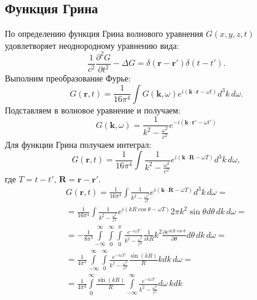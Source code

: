 \documentclass[a4paper,14pt]{extreport} %
\newcommand{\dff}[2]{\frac{\partial #1}{\partial #2}}
\newcommand{\dfs}[2]{\frac{\partial^2 #1}{\partial #2^2}}
\renewcommand{\vec}[1]{\boldsymbol{#1}}
\begin{document}
	\subsection{Функция Грина}
	
	По определению функция Грина волнового уравнения $G(x, y, z, t)$ удовлетворяет неоднородному уравнению вида:
	\begin{equation*}
		\frac{1}{c^2}\dfs{G}{t} - \Delta G = \delta(\vec{r} - \vec{r}') \delta(t - t').
	\end{equation*}
	Выполним преобразование Фурье:
	\begin{equation*}
		G(\vec{r}, t) = \frac{1}{16\pi^4} \int G(\vec{k}, \omega) e^{i\left(\vec{k}\cdot\vec{r} - \omega t\right)} d^3k\, d\omega.
	\end{equation*}
	Подставляем в волновое уравнение и получаем:
	\begin{equation*}
		G(\vec{k}, \omega) = \frac{1}{k^2 - \frac{\omega^2}{c^2}} e^{-i\left(\vec{k}\cdot\vec{r}' - \omega t'\right)}
	\end{equation*}
	Для функции Грина получаем интеграл:
	\begin{equation*}
		G(\vec{r}, t) = \frac{1}{16\pi^4} \int \frac{1}{k^2 - \frac{\omega^2}{c^2}} e^{i\left(\vec{k}\cdot\vec{R} - \omega T\right)} d^3k\, d\omega,
	\end{equation*}
	где $T = t - t'$, $\vec{R} = \vec{r} - \vec{r}'$.
	\begin{equation*}
		\begin{gathered}
			G(\vec{r}, t) = \frac{1}{16\pi^4} \int \frac{1}{k^2 - \frac{\omega^2}{c^2}} e^{i\left(\vec{k}\cdot\vec{R} - \omega T\right)} d^3k\, d\omega = \\ =
			\frac{1}{16\pi^4} \int \frac{1}{k^2 - \frac{\omega^2}{c^2}} e^{i\left(k R \cos \theta - \omega T\right)} 2 \pi k^2 \sin \theta d \theta\,dk \, d\omega = 
			\\ =
			-\frac{1}{8\pi^3} \int\limits_{-\infty}^\infty \int\limits_0^\infty \int\limits_0^\pi \frac{e^{-i \omega T}}{k^2 - \frac{\omega^2}{c^2}} \frac{1}{i k R} k^2 \dff{e^{i k R \cos \theta}}{\theta} d\theta\,dk \, d\omega = 
			\\ =
			\frac{1}{4\pi^3} \int\limits_{-\infty}^\infty \int\limits_0^\infty \frac{e^{-i \omega T}}{k^2 - \frac{\omega^2}{c^2}} \frac{\sin (kR)}{R} k dk \, d\omega = 
			\\ =
			\frac{1}{4\pi^3} \int\limits_0^\infty \frac{\sin (kR)}{R} \int\limits_{-\infty}^\infty  \frac{e^{-i \omega T}}{k^2 - \frac{\omega^2}{c^2}} d\omega \,k dk
		\end{gathered}
	\end{equation*}
	
\end{document}
